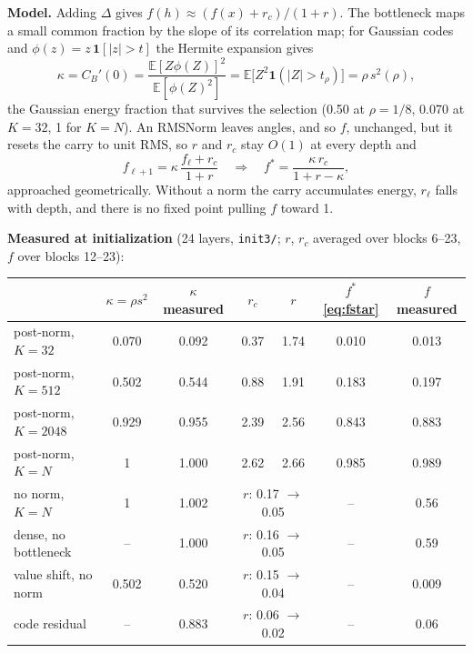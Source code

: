 \documentclass[11pt,a4paper]{article}
\newcommand{\code}[1]{\texttt{#1}}
\begin{document}
\textbf{Model.}  Adding \(\Delta\) gives \(f(h)\approx(f(x)+r_c)/(1+r)\).  The
bottleneck maps a small common fraction by the slope of its correlation map;
for Gaussian codes and \(\phi(z)=z\,\mathbf 1[|z|>t]\) the Hermite expansion
gives
\begin{equation}
  \kappa=C_B'(0)=\frac{\mathbb E[Z\phi(Z)]^2}{\mathbb E[\phi(Z)^2]}
  =\mathbb E\bigl[Z^2\mathbf 1(|Z|>t_\rho)\bigr]=\rho\,s^2(\rho),
\end{equation}
the Gaussian energy fraction that survives the selection (0.50 at
\(\rho=1/8\), 0.070 at \(K=32\), 1 for \(K=N\)).  An RMSNorm leaves angles, and
so \(f\), unchanged, but it resets the carry to unit RMS, so \(r\) and \(r_c\)
stay \(O(1)\) at every depth and
\begin{equation}
  f_{\ell+1}=\kappa\,\frac{f_\ell+r_c}{1+r}
  \quad\Longrightarrow\quad
  f^\ast=\frac{\kappa\,r_c}{1+r-\kappa},
  \label{eq:fstar}
\end{equation}
approached geometrically.  Without a norm the carry accumulates energy, \(r_\ell\)
falls with depth, and there is no fixed point pulling \(f\) toward 1.

\textbf{Measured at initialization} (24 layers, \code{init3/}; \(r\), \(r_c\)
averaged over blocks 6--23, \(f\) over blocks 12--23):

\begin{center}\small
\begin{tabular}{lcccccc}
\toprule
 & \(\kappa=\rho s^2\) & \(\kappa\) measured & \(r_c\) & \(r\) & \(f^\ast\) \eqref{eq:fstar} & \(f\) measured \\
\midrule
post-norm, \(K=32\)   & 0.070 & 0.092 & 0.37 & 1.74 & 0.010 & 0.013 \\
post-norm, \(K=512\)  & 0.502 & 0.544 & 0.88 & 1.91 & 0.183 & 0.197 \\
post-norm, \(K=2048\) & 0.929 & 0.955 & 2.39 & 2.56 & 0.843 & 0.883 \\
post-norm, \(K=N\)    & 1     & 1.000 & 2.62 & 2.66 & 0.985 & 0.989 \\
\midrule
no norm, \(K=N\)            & 1 & 1.002 & \multicolumn{2}{c}{\(r\): 0.17 \(\to\) 0.05} & -- & 0.56 \\
dense, no bottleneck        & -- & 1.000 & \multicolumn{2}{c}{\(r\): 0.16 \(\to\) 0.05} & -- & 0.59 \\
value shift, no norm        & 0.502 & 0.520 & \multicolumn{2}{c}{\(r\): 0.15 \(\to\) 0.04} & -- & 0.009 \\
code residual               & -- & 0.883 & \multicolumn{2}{c}{\(r\): 0.06 \(\to\) 0.02} & -- & 0.06 \\
\bottomrule
\end{tabular}
\end{center}
\end{document}
